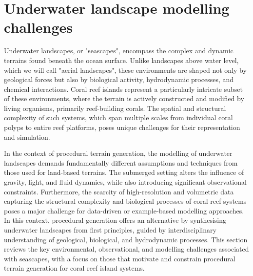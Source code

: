





\section{Underwater landscape modelling challenges}
Underwater landscapes, or "seascapes", encompass the complex and dynamic terrains found beneath the ocean surface. Unlike landscapes above water level, which we will call "aerial landscapes", these environments are shaped not only by geological forces but also by biological activity, hydrodynamic processes, and chemical interactions. Coral reef islands represent a particularly intricate subset of these environments, where the terrain is actively constructed and modified by living organisms, primarily reef-building corals. The spatial and structural complexity of such systems, which span multiple scales from individual coral polyps to entire reef platforms, poses unique challenges for their representation and simulation.

In the context of procedural terrain generation, the modelling of underwater landscapes demands fundamentally different assumptions and techniques from those used for land-based terrains. The submerged setting alters the influence of gravity, light, and fluid dynamics, while also introducing significant observational constraints. Furthermore, the scarcity of high-resolution and volumetric data capturing the structural complexity and biological processes of coral reef systems poses a major challenge for data-driven or example-based modelling approaches. In this context, procedural generation offers an alternative by synthesising underwater landscapes from first principles, guided by interdisciplinary understanding of geological, biological, and hydrodynamic processes. This section reviews the key environmental, observational, and modelling challenges associated with seascapes, with a focus on those that motivate and constrain procedural terrain generation for coral reef island systems.

